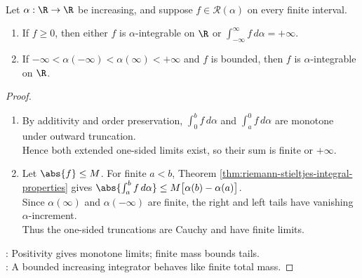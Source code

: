 \begin{theorem} \label{thm:improper-riemann-stieltjes-nonnegative-bounded-mass} \\
Let $\alpha:\R\to\R$ be increasing, and suppose $f\in\mathcal{R}(\alpha)$ on every finite interval.
\begin{enumerate}[label=(\roman*)]
\setlength{\itemsep}{0pt}
\item If $f\geq0$, then either $f$ is $\alpha$-integrable on $\R$ or $\int_{-\infty}^{\infty}f\,d\alpha=+\infty$.
\item If $-\infty<\alpha(-\infty)<\alpha(\infty)<+\infty$ and $f$ is bounded, then $f$ is $\alpha$-integrable on $\R$.
\end{enumerate}
\begin{proof}
\begin{enumerate}[label=(\roman*)]
\setlength{\itemsep}{0pt}
\item
By additivity and order preservation, $\int_0^b f\,d\alpha$ and $\int_a^0 f\,d\alpha$ are monotone under outward truncation.\\
Hence both extended one-sided limits exist, so their sum is finite or $+\infty$.
\item
Let $\abs{f}\leq M$. For finite $a<b$, Theorem \ref{thm:riemann-stieltjes-integral-properties} gives $\abs{\int_a^b f\,d\alpha}\leq M\bigl[\alpha(b)-\alpha(a)\bigr]$.\\
Since $\alpha(\infty)$ and $\alpha(-\infty)$ are finite, the right and left tails have vanishing $\alpha$-increment.\\
Thus the one-sided truncations are Cauchy and have finite limits.
\end{enumerate}
: Positivity gives monotone limits; finite mass bounds tails.\\
: A bounded increasing integrator behaves like finite total mass.
\end{proof}
\end{theorem}
